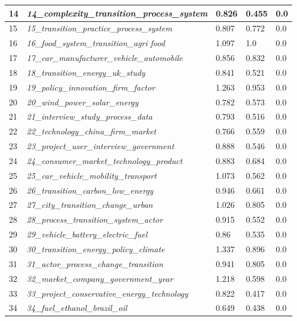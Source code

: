 \documentclass[12pt]{article}
\begin{document}
\begin{longtable}{|l|l|l|l|l|}
14 & \textit{14\_complexity\_transition\_process\_system} & 0.826 & 0.455 & 0.0 \\ \hline
15 & \textit{15\_transition\_practice\_process\_system} & 0.807 & 0.772 & 0.0 \\ \hline
16 & \textit{16\_food\_system\_transition\_agri food} & 1.097 & 1.0 & 0.0 \\ \hline
17 & \textit{17\_car\_manufacturer\_vehicle\_automobile} & 0.856 & 0.832 & 0.0 \\ \hline
18 & \textit{18\_transition\_energy\_uk\_study} & 0.841 & 0.521 & 0.0 \\ \hline
19 & \textit{19\_policy\_innovation\_firm\_factor} & 1.263 & 0.953 & 0.0 \\ \hline
20 & \textit{20\_wind\_power\_solar\_energy} & 0.782 & 0.573 & 0.0 \\ \hline
21 & \textit{21\_interview\_study\_process\_data} & 0.793 & 0.516 & 0.0 \\ \hline
22 & \textit{22\_technology\_china\_firm\_market} & 0.766 & 0.559 & 0.0 \\ \hline
23 & \textit{23\_project\_user\_interview\_government} & 0.888 & 0.546 & 0.0 \\ \hline
24 & \textit{24\_consumer\_market\_technology\_product} & 0.883 & 0.684 & 0.0 \\ \hline
25 & \textit{25\_car\_vehicle\_mobility\_transport} & 1.073 & 0.562 & 0.0 \\ \hline
26 & \textit{26\_transition\_carbon\_low\_energy} & 0.946 & 0.661 & 0.0 \\ \hline
27 & \textit{27\_city\_transition\_change\_urban} & 1.026 & 0.805 & 0.0 \\ \hline
28 & \textit{28\_process\_transition\_system\_actor} & 0.915 & 0.552 & 0.0 \\ \hline
29 & \textit{29\_vehicle\_battery\_electric\_fuel} & 0.86 & 0.535 & 0.0 \\ \hline
30 & \textit{30\_transition\_energy\_policy\_climate} & 1.337 & 0.896 & 0.0 \\ \hline
31 & \textit{31\_actor\_process\_change\_transition} & 0.941 & 0.805 & 0.0 \\ \hline
32 & \textit{32\_market\_company\_government\_year} & 1.218 & 0.598 & 0.0 \\ \hline
33 & \textit{33\_project\_conservative\_energy\_technology} & 0.822 & 0.417 & 0.0 \\ \hline
34 & \textit{34\_fuel\_ethanol\_brazil\_oil} & 0.649 & 0.438 & 0.0 \\ \hline

\end{longtable}
\end{document}
